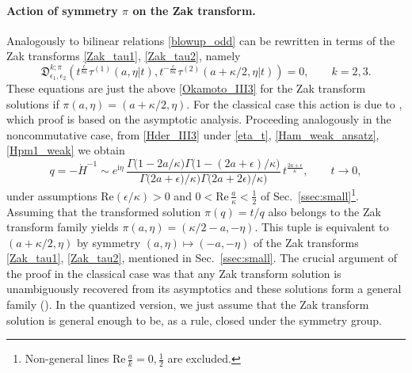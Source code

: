 \documentclass[12pt,a4paper]{article}
\numberwithin{equation}{section}
\newcommand{\ri}{\mathrm{i}}
\begin{document}
\paragraph{Action of symmetry $\pi$ on the Zak transform.}
Analogously to \cite[Sec. 2.3]{BST25} bilinear relations \eqref{blowup_odd} can be rewritten in terms of the Zak transforms \eqref{Zak_tau1}, \eqref{Zak_tau2}, namely 
\begin{equation}\label{Okamoto_blowup_III3}
\mathfrak{D}^{k;\pi}_{\epsilon_1,\epsilon_2}\left(t^{\frac{\epsilon}{8\kappa}}\tau^{(1)}(a,\eta|t), t^{-\frac{\epsilon}{8\kappa}}\tau^{(2)}(a+\kappa/2,\eta|t)\right)=0,\qquad k=2,3.   
\end{equation}
These equations are just the above \eqref{Okamoto_III3} for the Zak transform solutions if $\pi(a,\eta)=(a+\kappa/2,\eta)$. For the classical case this action is due to \cite[Prop. 3.1]{BS16b}, which proof is based on the asymptotic analysis. Proceeding analogously in the noncommutative case, from \eqref{Hder_III3} under \eqref{eta_t}, \eqref{Ham_weak_ansatz}, \eqref{Hpm1_weak} we obtain
\begin{equation}\label{q_as_III3}
q=-\dot{H}^{-1}\sim e^{\ri\eta}\,\frac{\Gamma\big(1-2a/\kappa\big)\Gamma\big(1-(2a{+}\epsilon)/\kappa\big)}{\Gamma\big(2a{+}\epsilon)/\kappa\big)\Gamma\big(2a{+}2\epsilon)/\kappa\big)}\,t^{\frac{2a+\epsilon}{\kappa}}, \qquad t\rightarrow 0,
\end{equation}
under assumptions $\mathrm{Re}(\epsilon/\kappa)>0$ and $0<\mathrm{Re}\,\frac{a}{\kappa}<\frac12$ of Sec.~\ref{ssec:small}\footnote{Non-general lines $\mathrm{Re}\,\frac{a}{k}=0,\frac12$ are excluded.}. Assuming that the transformed solution $\pi(q)=t/q$ also belongs to the Zak transform family yields $\pi(a,\eta)=(\kappa/2-a,-\eta)$. This tuple is equivalent to $(a+\kappa/2,\eta)$ by symmetry $(a,\eta)\mapsto(-a,-\eta)$ 
of the Zak transforms \eqref{Zak_tau1}, \eqref{Zak_tau2}, mentioned in Sec.~\ref{ssec:small}. The crucial argument of the proof in the classical case was that any Zak transform solution is unambiguously recovered from its asymptotics and these solutions form a general family (\cite[Prop. 2.1]{BS16b}).
In the quantized version, we just assume that the Zak transform solution is general enough to be, as a rule, closed under the symmetry group. 
\end{document}
